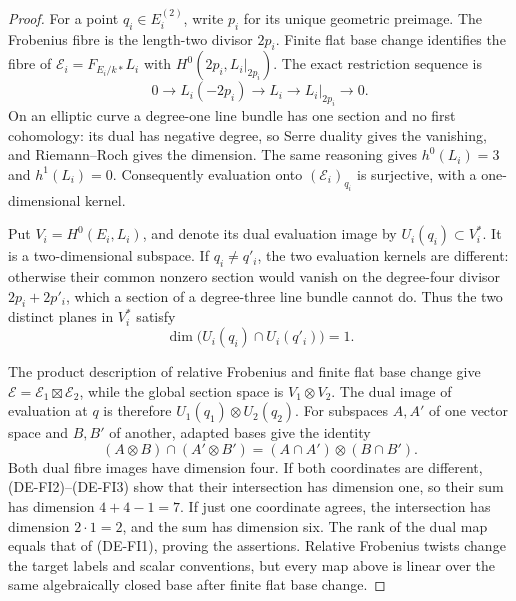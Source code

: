 \begin{proof}
For a point $q_i\in E_i^{(2)}$, write $p_i$ for its unique geometric
preimage. The Frobenius fibre is the length-two divisor $2p_i$.
Finite flat base change identifies the fibre of
$\mathcal E_i=F_{E_i/k*}L_i$ with
$H^0(2p_i,L_i|_{2p_i})$. The exact restriction sequence is
\[
0\longrightarrow L_i(-2p_i)\longrightarrow L_i
          \longrightarrow L_i|_{2p_i}\longrightarrow0.
\]
On an elliptic curve a degree-one line bundle has one section and
no first cohomology: its dual has negative degree, so Serre duality
gives the vanishing, and Riemann--Roch gives the dimension. The
same reasoning gives $h^0(L_i)=3$ and $h^1(L_i)=0$. Consequently
evaluation onto $(\mathcal E_i)_{q_i}$ is surjective, with a
one-dimensional kernel.

Put $V_i=H^0(E_i,L_i)$, and denote its dual evaluation image by
$U_i(q_i)\subset V_i^*$. It is a two-dimensional subspace. If
$q_i\ne q'_i$, the two evaluation kernels are different: otherwise
their common nonzero section would vanish on the degree-four
divisor $2p_i+2p'_i$, which a section of a degree-three line bundle
cannot do. Thus the two distinct planes in $V_i^*$ satisfy
\[
\dim\bigl(U_i(q_i)\cap U_i(q'_i)\bigr)=1.
\tag{DE-FI2}
\]

The product description of relative Frobenius and finite flat
base change give
$\mathcal E=\mathcal E_1\boxtimes\mathcal E_2$, while the
global section space is $V_1\otimes V_2$. The dual image of
evaluation at $q$ is therefore
$U_1(q_1)\otimes U_2(q_2)$. For subspaces $A,A'$ of one vector
space and $B,B'$ of another, adapted bases give the identity
\[
(A\otimes B)\cap(A'\otimes B')
                      =(A\cap A')\otimes(B\cap B').
\tag{DE-FI3}
\]
Both dual fibre images have dimension four. If both coordinates
are different, (DE-FI2)--(DE-FI3) show that their intersection has
dimension one, so their sum has dimension $4+4-1=7$.
If just one coordinate agrees, the intersection has dimension
$2\cdot1=2$, and the sum has dimension six. The rank of the dual
map equals that of (DE-FI1), proving the assertions. Relative
Frobenius twists change the target labels and scalar conventions,
but every map above is linear over the same algebraically closed
base after finite flat base change.
\end{proof}


